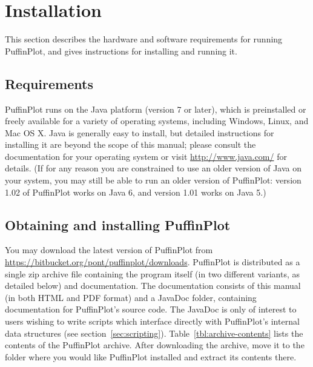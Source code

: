 \documentclass[a4paper,british]{article}
\begin{document}
\section{Installation}

This section describes the hardware and software requirements for
running PuffinPlot, and gives instructions for installing and running
it.

\subsection{Requirements}

PuffinPlot runs on the Java platform (version 7 or later), which is
preinstalled or freely available for a variety of operating systems,
including Windows, Linux, and Mac OS X. Java is generally easy to install,
but detailed instructions for installing it are beyond the scope of this
manual; please consult the documentation for your operating system or visit
\url{http://www.java.com/} for details. (If for any reason you are
constrained to use an older version of Java on your system, you may still
be able to run an older version of PuffinPlot: version 1.02 of PuffinPlot
works on Java 6, and version 1.01 works on Java 5.)

\subsection{Obtaining and installing PuffinPlot}

You may download the latest version of PuffinPlot from
\url{https://bitbucket.org/pont/puffinplot/downloads}. PuffinPlot is
distributed as a single zip archive file containing the program itself
(in two different variants, as detailed below) and documentation. The
documentation consists of this manual (in both HTML and PDF format) and
a JavaDoc folder, containing documentation for PuffinPlot's source code.
The JavaDoc is only of interest to users wishing to write scripts which
interface directly with PuffinPlot's internal data structures (see
section~\ref{sec:scripting}). Table~\ref{tbl:archive-contents} lists the
contents of the PuffinPlot archive. After downloading the archive, move
it to the folder where you would like PuffinPlot installed and extract
its contents there.
\end{document}
